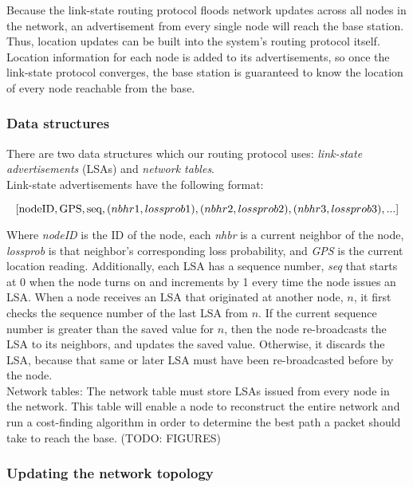 \documentclass[letterpaper]{article}
\begin{document}
\noindent Because the link-state routing protocol floods network updates across all nodes in the network,
an advertisement from every single node will reach the base station. Thus, location updates can be built 
into the system's routing protocol itself. Location information for each node is added to its 
advertisements, so once the link-state protocol converges, the base station is guaranteed to know the
location of every node reachable from the base.

\subsubsection{Data structures}

\noindent There are two data structures which our routing protocol uses: \emph{link-state advertisements} 
(LSAs) and \emph{network tables}. 
\\

\noindent Link-state advertisements have the following format:

$$ [\textnormal{nodeID}, \textnormal{GPS}, \textnormal{seq}, (nbhr1, lossprob1), 
(nbhr2, lossprob2), (nbhr3, lossprob3), ...] $$

\noindent Where \emph{nodeID} is the ID of the node, each \emph{nhbr} is a current neighbor of the node,
\emph{lossprob} is that neighbor's corresponding loss probability, and \emph{GPS} is the current location
reading. Additionally, each LSA has a sequence number, \emph{seq} that starts at 0 when the node turns on
and increments by 1 every time the node issues an LSA. When a node receives an LSA that originated at another
node, $n$, it first checks the sequence number of the last LSA from $n$. If the current sequence number is 
greater than the saved value for $n$, then the node re-broadcasts the LSA to its neighbors, and updates the 
saved value. Otherwise, it discards the LSA, because that same or later LSA must have been re-broadcasted 
before by the node. 
\\

\noindent Network tables: The network table must store LSAs issued from every node in the network. This
table will enable a node to reconstruct the entire network and run a cost-finding algorithm in order to
determine the best path a packet should take to reach the base. (TODO: FIGURES)
\\

\subsubsection{Updating the network topology}
\end{document}
